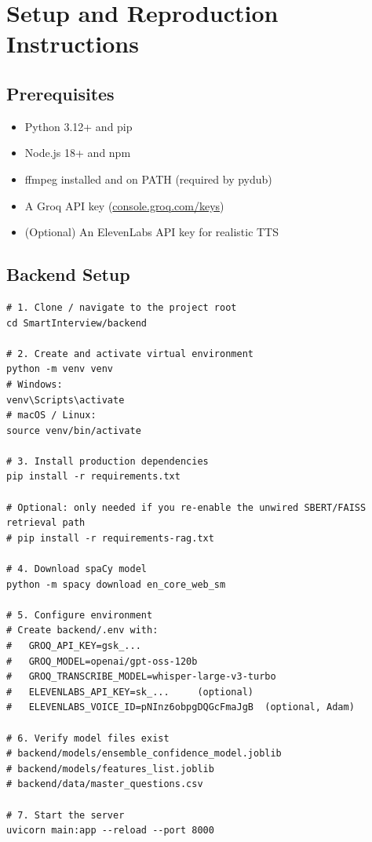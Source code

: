 \documentclass[12pt,a4paper]{article}
\begin{document}
\section{Setup and Reproduction Instructions}

\subsection{Prerequisites}

\begin{itemize}[leftmargin=1.5em]
  \item Python 3.12+ and pip
  \item Node.js 18+ and npm
  \item ffmpeg installed and on PATH (required by pydub)
  \item A Groq API key (\href{https://console.groq.com/keys}{console.groq.com/keys})
  \item (Optional) An ElevenLabs API key for realistic TTS
\end{itemize}

\subsection{Backend Setup}

\begin{lstlisting}[style=bash, numbers=none]
# 1. Clone / navigate to the project root
cd SmartInterview/backend

# 2. Create and activate virtual environment
python -m venv venv
# Windows:
venv\Scripts\activate
# macOS / Linux:
source venv/bin/activate

# 3. Install production dependencies
pip install -r requirements.txt

# Optional: only needed if you re-enable the unwired SBERT/FAISS retrieval path
# pip install -r requirements-rag.txt

# 4. Download spaCy model
python -m spacy download en_core_web_sm

# 5. Configure environment
# Create backend/.env with:
#   GROQ_API_KEY=gsk_...
#   GROQ_MODEL=openai/gpt-oss-120b
#   GROQ_TRANSCRIBE_MODEL=whisper-large-v3-turbo
#   ELEVENLABS_API_KEY=sk_...     (optional)
#   ELEVENLABS_VOICE_ID=pNInz6obpgDQGcFmaJgB  (optional, Adam)

# 6. Verify model files exist
# backend/models/ensemble_confidence_model.joblib
# backend/models/features_list.joblib
# backend/data/master_questions.csv

# 7. Start the server
uvicorn main:app --reload --port 8000
\end{lstlisting}
\end{document}
